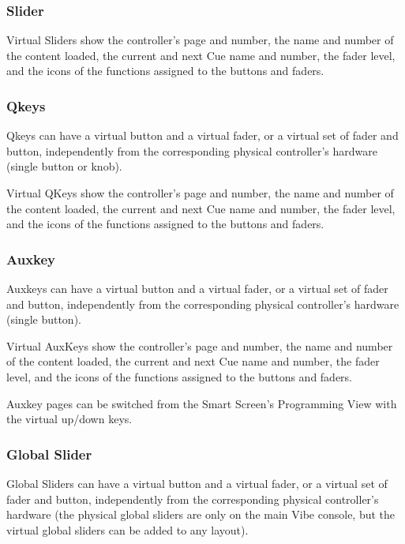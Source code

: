 \documentclass[
]{article}
\begin{document}
\hypertarget{slider-1}{%
\subsubsection{Slider}\label{slider-1}}

Virtual Sliders show the controller's page and number, the name and number of the content loaded, the current and next Cue name and number, the fader level, and the icons of the functions assigned to the buttons and faders.

\hypertarget{qkeys}{%
\subsubsection{Qkeys}\label{qkeys}}

Qkeys can have a virtual button and a virtual fader, or a virtual set of fader and button, independently from the corresponding physical controller's hardware (single button or knob).

Virtual QKeys show the controller's page and number, the name and number of the content loaded, the current and next Cue name and number, the fader level, and the icons of the functions assigned to the buttons and faders.

\hypertarget{auxkey-1}{%
\subsubsection{Auxkey}\label{auxkey-1}}

Auxkeys can have a virtual button and a virtual fader, or a virtual set of fader and button, independently from the corresponding physical controller's hardware (single button).

Virtual AuxKeys show the controller's page and number, the name and number of the content loaded, the current and next Cue name and number, the fader level, and the icons of the functions assigned to the buttons and faders.

Auxkey pages can be switched from the Smart Screen's Programming View with the virtual up/down keys.

\hypertarget{global-slider-1}{%
\subsubsection{Global Slider}\label{global-slider-1}}

Global Sliders can have a virtual button and a virtual fader, or a virtual set of fader and button, independently from the corresponding physical controller's hardware (the physical global sliders are only on the main Vibe console, but the virtual global sliders can be added to any layout).
\end{document}
